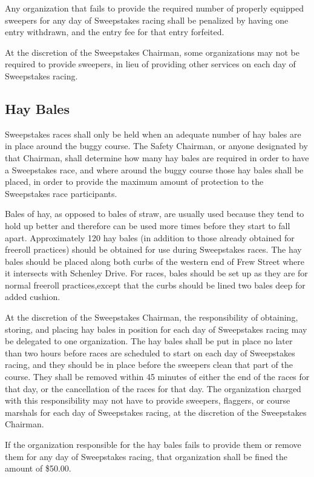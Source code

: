 \documentclass[openany]{book}
\begin{document}
Any organization that fails to provide the required number of properly equipped sweepers for any day of Sweepstakes racing shall be penalized by having one entry withdrawn, and the entry fee for that entry forfeited.

At the discretion of the Sweepstakes Chairman, some organizations may not be required to provide sweepers, in lieu of providing other services on each day of Sweepstakes racing.

\subsection{Hay Bales}

Sweepstakes races shall only be held when an adequate number of hay bales are in place around the buggy course. The Safety Chairman, or anyone designated by that Chairman, shall determine how many hay bales are required in order to have a Sweepstakes race, and where around the buggy course those hay bales shall be placed, in order to provide the maximum amount of protection to the Sweepstakes race participants.

Bales of hay, as opposed to bales of straw, are usually used because they tend to hold up better and therefore can be used more times before they start to fall apart. Approximately 120 hay bales (in addition to those already obtained for freeroll practices) should be obtained for use during Sweepstakes races. The hay bales should be placed along both curbs of the western end of Frew Street where it intersects with Schenley Drive. For races, bales should be set up as they are for normal freeroll practices,except that the curbs should be lined two bales deep for added cushion.

At the discretion of the Sweepstakes Chairman, the responsibility of obtaining, storing, and placing hay bales in position for each day of Sweepstakes racing may be delegated to one organization. The hay bales shall be put in place no later than two hours before races are scheduled to start on each day of Sweepstakes racing, and they should be in place before the sweepers clean that part of the course. They shall be removed within 45 minutes of either the end of the races for that day, or the cancellation of the races for that day. The organization charged with this responsibility may not have to provide sweepers, flaggers, or course marshals for each day of Sweepstakes racing, at the discretion of the Sweepstakes Chairman.

If the organization responsible for the hay bales fails to provide them or remove them for any day of Sweepstakes racing, that organization shall be fined the amount of \$50.00.
\end{document}
